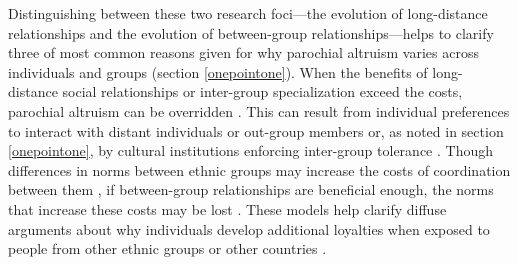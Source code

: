 \documentclass[bibauthoryear]{aa}
\begin{document}
Distinguishing between these two research foci---the evolution of long-distance relationships and the evolution of between-group relationships---helps to clarify three of most common reasons given for why parochial altruism varies across individuals and groups (section \ref{onepointone}). When the benefits of long-distance social relationships or inter-group specialization exceed the costs, parochial altruism can be overridden \citep[e.g.,][]{bellmoya}. This can result from individual preferences to interact with distant individuals \citep{pisor2019evolution} or out-group members \citep{moya2015different, brewer1976ethnocentrism} or, as noted in section \ref{onepointone}, by cultural institutions enforcing inter-group tolerance \citep{fearon1996explaining, fry2018evolutionary}. Though differences in norms between ethnic groups may increase the costs of coordination between them \citep{bellmoya, habyarimana2007does, mcelreath2003shared}, if between-group relationships are beneficial enough, the norms that increase these costs may be lost \citep{bunce2017interethnic, bunce2018sustainability}. These models help clarify diffuse arguments about why individuals develop additional loyalties when exposed to people from other ethnic groups or other countries \citep[e.g.,][]{brewer1976ethnocentrism, beck2006cosmopolitan, hruschka2013economic, buchan2009globalization, fukuyama2001social, mau2008cosmopolitan, singer2011expanding}.

\end{document}
